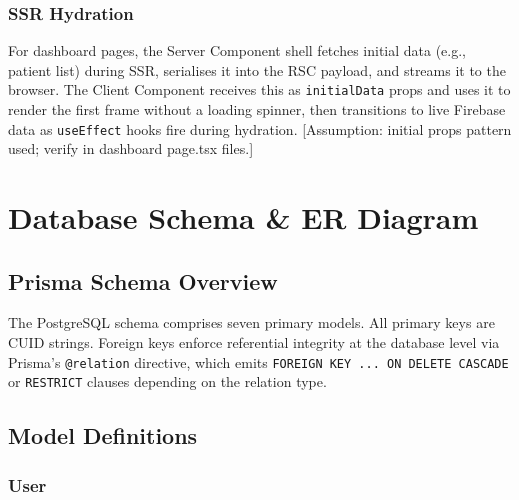 \documentclass[12pt,a4paper]{report}
\begin{document}
\subsection{SSR Hydration}

For dashboard pages, the Server Component shell fetches initial data
(e.g., patient list) during SSR, serialises it into the RSC payload,
and streams it to the browser. The Client Component receives this as
\texttt{initialData} props and uses it to render the first frame
without a loading spinner, then transitions to live Firebase data
as \texttt{useEffect} hooks fire during hydration.
[Assumption: initial props pattern used; verify in dashboard page.tsx files.]

\chapter{Database Schema \& ER Diagram}
\label{ch:db}

\section{Prisma Schema Overview}

The PostgreSQL schema comprises seven primary models. All primary keys
are CUID strings. Foreign keys enforce referential integrity at the
database level via Prisma's \texttt{@relation} directive, which emits
\texttt{FOREIGN KEY ... ON DELETE CASCADE} or \texttt{RESTRICT} clauses
depending on the relation type.

\section{Model Definitions}

\subsection{User}
\end{document}
